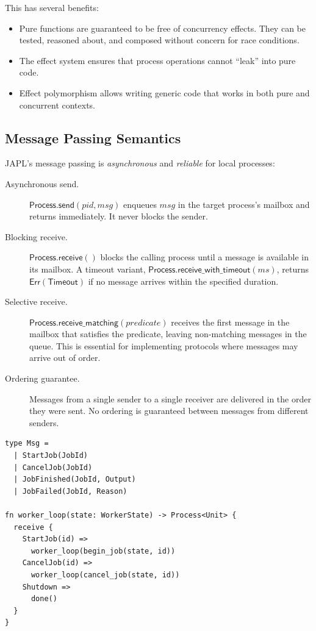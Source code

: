 \documentclass[11pt,a4paper]{article}
\begin{document}
This has several benefits:
\begin{itemize}
\item Pure functions are guaranteed to be free of concurrency effects. They can be tested, reasoned about, and composed without concern for race conditions.
\item The effect system ensures that process operations cannot ``leak'' into pure code.
\item Effect polymorphism allows writing generic code that works in both pure and concurrent contexts.
\end{itemize}

\subsection{Message Passing Semantics}

JAPL's message passing is \emph{asynchronous} and \emph{reliable} for local processes:

\begin{description}
\item[Asynchronous send.] $\mathsf{Process.send}(pid, msg)$ enqueues $msg$ in the target process's mailbox and returns immediately. It never blocks the sender.

\item[Blocking receive.] $\mathsf{Process.receive}()$ blocks the calling process until a message is available in its mailbox. A timeout variant, $\mathsf{Process.receive\_with\_timeout}(ms)$, returns $\mathsf{Err}(\mathsf{Timeout})$ if no message arrives within the specified duration.

\item[Selective receive.] $\mathsf{Process.receive\_matching}(predicate)$ receives the first message in the mailbox that satisfies the predicate, leaving non-matching messages in the queue. This is essential for implementing protocols where messages may arrive out of order.

\item[Ordering guarantee.] Messages from a single sender to a single receiver are delivered in the order they were sent. No ordering is guaranteed between messages from different senders.
\end{description}

\begin{lstlisting}[language=japl,caption={Message passing primitives}]
type Msg =
  | StartJob(JobId)
  | CancelJob(JobId)
  | JobFinished(JobId, Output)
  | JobFailed(JobId, Reason)

fn worker_loop(state: WorkerState) -> Process<Unit> {
  receive {
    StartJob(id) =>
      worker_loop(begin_job(state, id))
    CancelJob(id) =>
      worker_loop(cancel_job(state, id))
    Shutdown =>
      done()
  }
}
\end{lstlisting}
\end{document}
